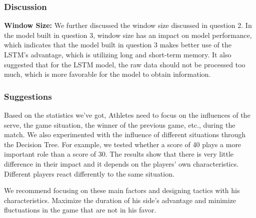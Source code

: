 \subsubsection{Discussion}
\textbf{Window Size: }
    We further discussed the window size discussed in question 2. In the model built in question 3, window size has an impact on model performance, which indicates that the model built in question 3 makes better use of the LSTM's advantage, which is utilizing long and short-term memory. It also suggested that for the LSTM model, the raw data should not be processed too much, which is more favorable for the model to obtain information.

\subsubsection{Suggestions}
Based on the statistics we've got, Athletes need to focus on the influences of the serve, the game situation, the winner of the previous game, etc., during the match. We also experimented with the influence of different situations through the Decision Tree. For example, we tested whether a score of 40 plays a more important role than a score of 30. The results show that there is very little difference in their impact and it depends on the players' own characteristics. Different players react differently to the same situation. \par

We recommend focusing on these main factors and designing tactics with his characteristics. Maximize the duration of his side's advantage and minimize fluctuations in the game that are not in his favor. \par

